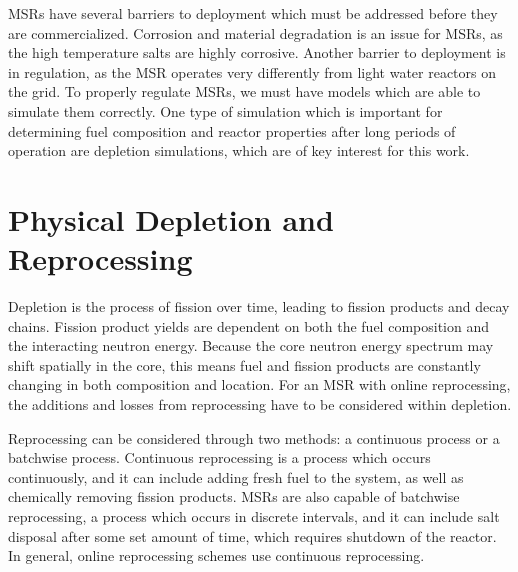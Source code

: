 MSRs have several barriers to deployment which must be addressed before they are commercialized. Corrosion and material degradation is an issue for MSRs, as the high temperature salts are highly corrosive. Another barrier to deployment is in regulation, as the MSR operates very differently from light water reactors on the grid.
To properly regulate MSRs, we must have models which are able to simulate them correctly. One type of simulation which is important for determining fuel composition and reactor properties after long periods of operation are depletion simulations, which are of key interest for this work.

\section{Physical Depletion and Reprocessing}


Depletion is the process of fission over time, leading to fission products and decay chains.
Fission product yields are dependent on both the fuel composition and the interacting neutron energy.
Because the core neutron energy spectrum may shift spatially in the core, this means fuel and fission products are constantly changing in both composition and location.
For an MSR with online reprocessing, the additions and losses from reprocessing have to be considered within depletion.

Reprocessing can be considered through two methods: a continuous process or a batchwise process.
Continuous reprocessing is a process which occurs continuously, and it can include adding fresh fuel to the system, as well as chemically removing fission products.
MSRs are also capable of batchwise reprocessing, a process which occurs in discrete intervals, and it can include salt disposal after some set amount of time, which requires shutdown of the reactor.
In general, online reprocessing schemes use continuous reprocessing.

